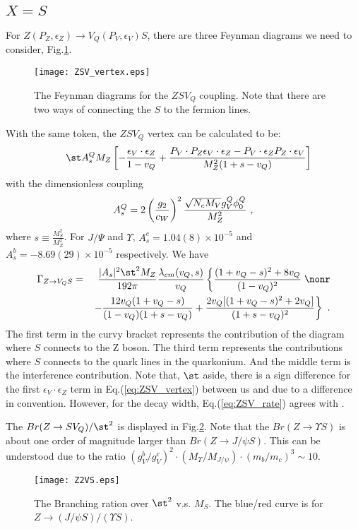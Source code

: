 \documentclass[11pt]{article}
\begin{document}
\subsection{$X=S$}
For $Z(P_Z,\epsilon_Z)\to V_Q(P_V,\epsilon_V) S$, there are three Feynman diagrams we need to consider, Fig.\ref{fig:ZSV_vertex}.
\begin{figure}
    \centering
    \texttt{[image: ZSV\_vertex.eps]}
    \caption{The Feynman diagrams for the $ZSV_Q$ coupling. Note that there are two ways of connecting the $S$ to the fermion lines. }
   \label{fig:ZSV_vertex}
\end{figure}
With the same token, the $Z S V_Q$  vertex can be calculated to be:
\begin{eqnarray}
&& \st A_s^Q M_Z \left[ -{ \epsilon_V \cdot \epsilon_Z \over 1- v_Q} + { P_V\cdot P_Z \epsilon_V\cdot\epsilon_Z - P_V\cdot \epsilon_Z P_Z\cdot \epsilon_V \over M_Z^2(1+s-v_Q) }\right]\end{eqnarray}
 with the dimensionless coupling
\begin{eqnarray}
 A_s^Q= 2 \left(\frac{g_2}{c_W}\right)^2{ \sqrt{N_c M_V} g^Q_V \phi_0^Q \over M_Z^2}\ ,
\label{eq:ZSV_vertex}
\end{eqnarray}
where $s\equiv \frac{M_S^2}{M_Z^2}$.
For $J/\Psi$ and $\Upsilon$, $A_s^c= 1.04(8)\times 10^{-5}$  and $A_s^b= -8.69(29)\times 10^{-5}$ respectively.
We have
\begin{eqnarray}
\Gamma _{Z \to V_Q S} &=&{|A_s|^2\st^2  M_Z \over 192 \pi}{\lambda_{cm}(v_Q,s) \over v_Q}
\left\{ {(1+v_Q-s)^2+8v_Q\over (1-v_Q)^2}\right.  \nonr \\
&&\left. -{12v_Q(1+v_Q-s)\over(1-v_Q)(1+s-v_Q)}+{2v_Q[(1+v_Q-s)^2+2v_Q]\over(1+s-v_Q)^2}\right\}\ .
\label{eq:ZSV_rate}
\end{eqnarray}
The first term in the curvy bracket represents the contribution of the diagram where $S$ connects to the Z boson.
The third term represents the contributions where $S$ connects to the quark lines in the quarkonium.
And the middle term is the interference contribution.
Note that, $\st$ aside, there is a sign difference for the first $ \epsilon_V \cdot \epsilon_Z$ term in Eq.(\ref{eq:ZSV_vertex})
between us and \cite{Guberina:1980dc} due to a difference in convention.
However, for the decay width, Eq.(\ref{eq:ZSV_rate}) agrees with \cite{Guberina:1980dc}.

The $Br(Z\to S V_Q)/\st^2$ is displayed in Fig.\ref{fig:Z2VQS}.
Note that the $Br(Z\to \Upsilon S)$ is about one order of magnitude larger than $Br(Z\to J/\psi S)$. This can be understood due to
the ratio $(g_V^b/g_V^c)^2\cdot (M_\Upsilon/M_{J/\psi})\cdot(m_b/m_c)^3\sim 10$.
\begin{figure}
    \centering
    \texttt{[image: Z2VS.eps]}
    \caption{The Branching ration over $\st^2$ v.s. $M_S$. The blue/red curve is for $Z\to (J/\psi S )/(\Upsilon S )$.}
   \label{fig:Z2VQS}
\end{figure}
\end{document}
